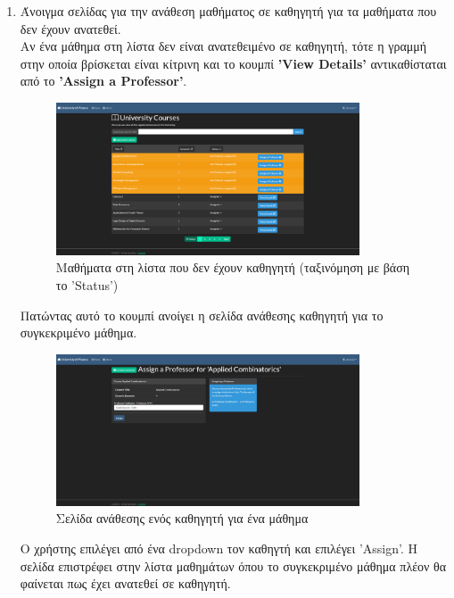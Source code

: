 \documentclass[12pt]{article}
\begin{document}
\begin{enumerate}
	\item Άνοιγμα σελίδας για την ανάθεση μαθήματος σε καθηγητή για τα μαθήματα που δεν έχουν ανατεθεί.\\
	
	Αν ένα μάθημα στη λίστα δεν είναι  ανατεθειμένο σε καθηγητή, τότε η γραμμή στην οποία βρίσκεται είναι κίτρινη και το κουμπί \textbf{'View Details'} αντικαθίσταται από το \textbf{'Assign a Professor'}.
	
	\begin{figure}[H]
		\centering
		\includegraphics[width=0.85\textwidth]{nohelp.png}
		\caption{Μαθήματα στη λίστα που δεν έχουν καθηγητή (ταξινόμηση με βάση το 'Status')}
		\label{fig:emptyView}
	\end{figure}

	Πατώντας αυτό το κουμπί ανοίγει η σελίδα ανάθεσης καθηγητή για το συγκεκριμένο μάθημα.
	
	\begin{figure}[H]
		\centering
		\includegraphics[width=0.85\textwidth]{here.png}
		\caption{Σελίδα ανάθεσης ενός καθηγητή για ένα μάθημα}
		\label{fig:emptyView}
	\end{figure}
	
	Ο χρήστης επιλέγει από ένα dropdown τον καθηγτή και επιλέγει 'Assign'. Η σελίδα επιστρέφει στην λίστα μαθημάτων όπου το συγκεκριμένο μάθημα πλέον θα φαίνεται πως έχει ανατεθεί σε καθηγητή.

\end{enumerate}
\end{document}
